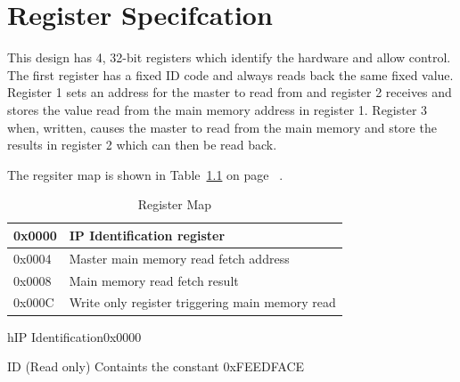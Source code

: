 \documentclass{report}
\begin{document}
\chapter{Register Specifcation}
This design has 4, 32-bit registers which identify the hardware and allow control.
The first register has a fixed ID code and always reads back the same fixed value.
Register 1 sets an address for the master to read from and register 2 receives and
stores the value read from the main memory address in register 1.  Register 3 when,
written, causes the master to read from the main memory and store the results in
register 2 which can then be read back.

The regsiter map is shown in
Table~\ref{table:bar0regmap} on page
~\pageref{table:bar0regmap}.  

\begin{table}[h]
\begin{tabular}{||l|l||}
\hline
 0x0000 & IP Identification register\\
\hline
 0x0004 & Master main memory read fetch address \\
\hline
 0x0008 & Main memory read fetch result \\
\hline
 0x000C & Write only register triggering main memory read \\
\hline
\end{tabular}
\caption{Register Map}
\label{table:bar0regmap}
\end{table}



\begin{register}{h}{IP Identification}{0x0000}%
\label{ID}%
\regnewline%
\begin{regdesc}\begin{reglist}
\item [ID](Read only) Containts the constant 0xFEEDFACE 
\end{reglist}\end{regdesc}\end{register}
\end{document}
